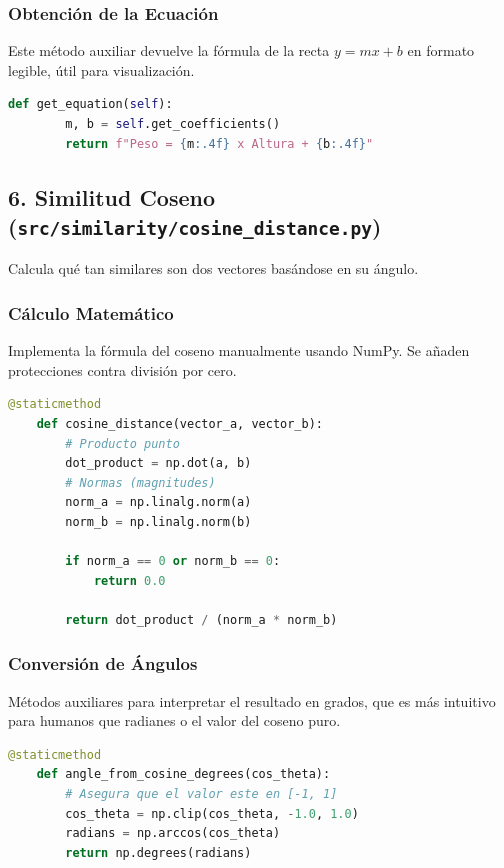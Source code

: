\documentclass[12pt, a4paper]{article}
\begin{document}
\subsubsection{Obtención de la Ecuación}
Este método auxiliar devuelve la fórmula de la recta $y = mx + b$ en formato legible, útil para visualización.
\begin{lstlisting}[language=Python]
    def get_equation(self):
        m, b = self.get_coefficients()
        return f"Peso = {m:.4f} x Altura + {b:.4f}"
\end{lstlisting}

\newpage
\subsection{6. Similitud Coseno (\texttt{src/similarity/cosine\_distance.py})}
Calcula qué tan similares son dos vectores basándose en su ángulo.

\subsubsection{Cálculo Matemático}
Implementa la fórmula del coseno manualmente usando NumPy. Se añaden protecciones contra división por cero.
\begin{lstlisting}[language=Python]
    @staticmethod
    def cosine_distance(vector_a, vector_b):
        # Producto punto
        dot_product = np.dot(a, b)
        # Normas (magnitudes)
        norm_a = np.linalg.norm(a)
        norm_b = np.linalg.norm(b)
        
        if norm_a == 0 or norm_b == 0:
            return 0.0
            
        return dot_product / (norm_a * norm_b)
\end{lstlisting}

\subsubsection{Conversión de Ángulos}
Métodos auxiliares para interpretar el resultado en grados, que es más intuitivo para humanos que radianes o el valor del coseno puro.
\begin{lstlisting}[language=Python]
    @staticmethod
    def angle_from_cosine_degrees(cos_theta):
        # Asegura que el valor este en [-1, 1]
        cos_theta = np.clip(cos_theta, -1.0, 1.0)
        radians = np.arccos(cos_theta)
        return np.degrees(radians)
\end{lstlisting}
\end{document}

